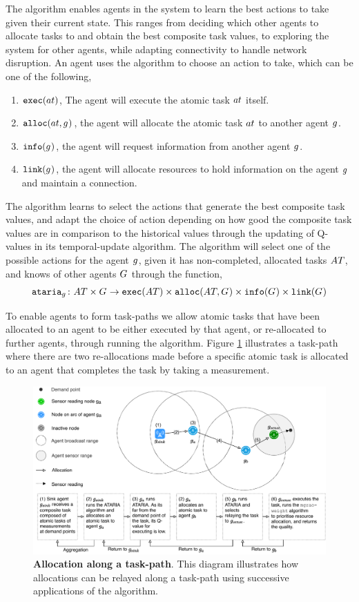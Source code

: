 The \acronymATARIA{}{} algorithm enables agents in the system to learn the best actions to take given their current state. This ranges from deciding which other agents to allocate tasks to and obtain the best composite task values, to exploring the system for other agents, while adapting connectivity to handle network disruption. An agent uses the \acronymATARIA{}{} algorithm to choose an action to take, which can be one of the following,
\begin{enumerate}
	\item $\functionExec{}{}$, The agent will execute the atomic task $\varAtomicTask{}{}$ itself.
	\item $\functionAlloc{}{}$, the agent will allocate the atomic task $\varAtomicTask{}{}$ to another agent $g_{}^{}$.
	\item $\texttt{info}(g_{}^{})$, the agent will request information from another agent $g_{}^{}$.
	\item $\texttt{link}(g_{}^{})$, the agent will allocate resources to hold information on the agent $g_{}^{}$ and maintain a connection.
\end{enumerate}
The \acronymATARIA{}{} algorithm learns to select the actions that generate the best composite task values, and adapt the choice of action depending on how good the composite task values are in comparison to the historical values through the updating of Q-values in its temporal-update algorithm. The algorithm will select one of the possible actions for the agent $g_{}^{}$, given it has non-completed, allocated tasks $\setAtomicTask{}{}$, and knows of other agents $G_{}^{}$ through the function,
\begin{equation}
\label{eq:ataria}\formalATARIA{}{}
\end{equation}

To enable agents to form task-paths we allow atomic tasks that have been allocated to an agent to be either executed by that agent, or re-allocated to further agents, through running the \acronymATARIA{}{} algorithm. Figure \ref{fig:arc-flow} illustrates a task-path where there are two re-allocations made before a specific atomic task is allocated to an agent that completes the task by taking a measurement.
\begin{figure}[ht]
	\centering
	\includegraphics[width=0.8\linewidth, trim={25pt 0pt 25pt 0pt, clip}]{arc-flow}
	\caption{\textbf{Allocation along a task-path}. This diagram illustrates how allocations can be relayed along a task-path using successive applications of the \acronymATARIA{}{} algorithm.}
	\label{fig:arc-flow}
\end{figure}

